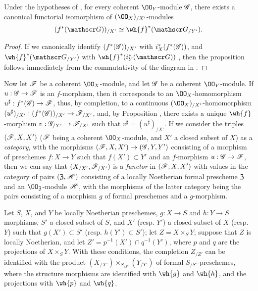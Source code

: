 \begin{prop}[10.9.5]
\label{1.10.9.5}
Under the hypotheses of , for every coherent $\OO_Y$-module $\mathscr{G}$, there exists a canonical functorial isomorphism of $(\OO_X)_{/X'}$-modules
\[
  (f^*(\sh{G}))_{/X'}\isoto\wh{f}^*(\sh{G}_{/Y'}).
\]
\end{prop}

\begin{proof}
\label{proof-1.10.9.5}
If we canonically identify $(f^*(\mathscr{G}))_{/X'}$ with $i_X^*(f^*(\mathscr{G}))$, and $\wh{f}^*(\sh{G}_{/Y'})$ with $\wh{f}^*(i_Y^*(\sh{G}))$ , then the proposition follows immediately from the commutativity of the diagram in .
\end{proof}

\begin{env}[10.9.6]
\label{1.10.9.6}
Now let $\mathscr{F}$ be a coherent $\OO_X$-module, and let $\mathscr{G}$ be a coherent $\OO_Y$-module.
If $u:\sh{G}\to\sh{F}$ is an $f$-morphism, then it corresponds to an $\OO_X$-homomorphism $u^\sharp:f^*(\sh{G})\to\sh{F}$, thus, by completion, to a continuous $(\OO_X)_{/X'}$-homomorphism $(u^\sharp)_{/X'}:(f^*(\sh{G}))_{/X'}\to\sh{F}_{/X'}$, and, by Proposition , there exists a unique $\wh{f}$-morphism $v:\sh{G}_{/Y'}\to\sh{F}_{/X'}$
such that $v^\sharp=(u^\sharp)_{/X'}$.
If we consider the triples $(\mathscr{F},X,X')$ ($\mathscr{F}$ being a coherent $\OO_X$-module, and $X'$ a closed subset of $X$) as a \emph{category}, with the morphisms $(\sh{F},X,X')\to(\sh{G},Y,Y')$ consisting of a morphism of preschemes $f:X\to Y$ such that $f(X')\subset Y'$ and an $f$-morphism $u:\sh{G}\to\sh{F}$, then we can say that $(X_{/X'},\mathscr{F}_{/X'})$ is a \emph{functor} in $(\mathscr{F},X,X')$ with values in the category of pairs $(\mathfrak{Z},\mathscr{H})$ consisting of a locally Noetherian formal prescheme $\mathfrak{Z}$ and an $\OO_\mathfrak{Z}$-module $\mathscr{H}$, with the morphisms of the latter category being the pairs consisting of a morphism $g$ of formal preschemes and a $g$-morphism.
\end{env}

\begin{prop}[10.9.7]
\label{1.10.9.7}
Let $S$, $X$, and $Y$ be locally Noetherian preschemes, $g:X\to S$ and $h:Y\to S$ morphisms, $S'$ a closed subset of $S$, and $X'$ (resp. $Y'$) a closed subset of $X$ (resp. $Y$) such that $g(X')\subset S'$ (resp. $h(Y')\subset S'$); let $Z=X\times_S Y$; suppose that $Z$ is locally Noetherian, and let $Z'=p^{-1}(X')\cap q^{-1}(Y')$, where $p$ and $q$ are the projections of $X\times_S Y$.
With these conditions, the completion $Z_{/Z'}$ can be identified with the product $(X_{/X'})\times_{S_{/S'}}(Y_{/Y'})$ of formal $S_{/S'}$-preschemes, where the structure morphisms are identified with $\wh{g}$ and $\wh{h}$, and the projections with $\wh{p}$ and $\wh{q}$.
\end{prop}

